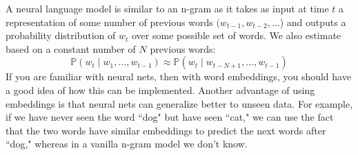 \documentclass{article}
\begin{document}
    A neural language model is similar to an n-gram as it takes as input at time $t$ a representation of some number of previous words $(w_{t-1}, w_{t-2}, \ldots$) and outputs a probability distribution of $w_t$ over some possible set of words. We also estimate based on a constant number of $N$ previous words: 
    \begin{equation}
      \mathbb{P}(w_t \mid w_1, \ldots, w_{t-1}) \approx \mathbb{P}( w_t \mid w_{t - N + 1}, \ldots, w_{t-1})
    \end{equation}
    If you are familiar with neural nets, then with word embeddings, you should have a good idea of how this can be implemented. Another advantage of using embeddings is that neural nets can generalize better to unseen data. For example, if we have never seen the word ``dog" but have seen ``cat," we can use the fact that the two words have similar embeddings to predict the next words after ``dog," whereas in a vanilla n-gram model we don't know. 
\end{document}
